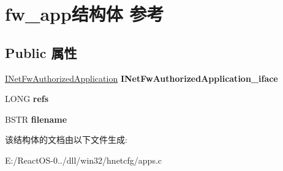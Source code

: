 \hypertarget{structfw__app}{}\section{fw\+\_\+app结构体 参考}
\label{structfw__app}
\subsection*{Public 属性}
\begin{DoxyCompactItemize}
\item 
\mbox{\label{structfw__app_a950f053bda663174a0168b9abe516e70}} 
\hyperlink{interface_i_net_fw_authorized_application}{I\+Net\+Fw\+Authorized\+Application} {\bfseries I\+Net\+Fw\+Authorized\+Application\+\_\+iface}
\item 
\mbox{\label{structfw__app_aa4ec67370f71ebffdd05dbd307a3ea3c}} 
L\+O\+NG {\bfseries refs}
\item 
\mbox{\label{structfw__app_adc74dd69df75f6e42b7d1fa225397744}} 
B\+S\+TR {\bfseries filename}
\end{DoxyCompactItemize}


该结构体的文档由以下文件生成\+:\begin{DoxyCompactItemize}
\item 
E\+:/\+React\+O\+S-\/0../dll/win32/hnetcfg/apps.\+c\end{DoxyCompactItemize}
